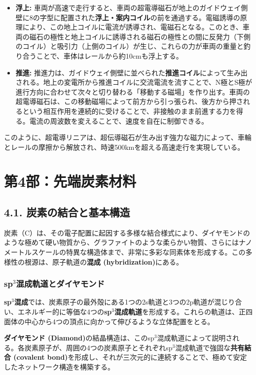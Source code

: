 \documentclass[11pt,a4paper]{ltjsarticle}
\begin{document}
\begin{itemize}
\item \textbf{浮上:} 車両が高速で走行すると、車両の超電導磁石が地上のガイドウェイ側壁に8の字型に配置された\textbf{浮上・案内コイル}の前を通過する。電磁誘導の原理により、この地上コイルに電流が誘導され、電磁石となる。このとき、車両の磁石の極性と地上コイルに誘導される磁石の極性との間に反発力（下側のコイル）と吸引力（上側のコイル）が生じ、これらの力が車両の重量と釣り合うことで、車体はレールから約10cmも浮上する。
\item \textbf{推進:} 推進力は、ガイドウェイ側壁に並べられた\textbf{推進コイル}によって生み出される。地上の変電所から推進コイルに交流電流を流すことで、N極とS極が進行方向に合わせて次々と切り替わる「移動する磁場」を作り出す。車両の超電導磁石は、この移動磁場によって前方から引っ張られ、後方から押されるという相互作用を連続的に受けることで、非接触のまま前進する力を得る。電流の周波数を変えることで、速度を自在に制御できる。
\end{itemize}

このように、超電導リニアは、超伝導磁石が生み出す強力な磁力によって、車輪とレールの摩擦から解放され、時速500kmを超える高速走行を実現している。

\section*{第4部：先端炭素材料}

\subsection*{4.1. 炭素の結合と基本構造}

炭素（C）は、その電子配置に起因する多様な結合様式により、ダイヤモンドのような極めて硬い物質から、グラファイトのような柔らかい物質、さらにはナノメートルスケールの特異な構造体まで、非常に多彩な同素体を形成する。この多様性の根源は、原子軌道の\textbf{混成 (hybridization)}にある。

\subsubsection*{sp$^3$混成軌道とダイヤモンド}

\textbf{sp$^3$混成}では、炭素原子の最外殻にある1つの2s軌道と3つの2p軌道が混じり合い、エネルギー的に等価な4つの\textbf{sp$^3$混成軌道}を形成する。これらの軌道は、正四面体の中心から4つの頂点に向かって伸びるような立体配置をとる。

\textbf{ダイヤモンド (Diamond)}の結晶構造は、このsp$^3$混成軌道によって説明される。各炭素原子が、周囲の4つの炭素原子とそれぞれsp$^3$混成軌道で強固な\textbf{共有結合 (covalent bond)}を形成し、それが三次元的に連続することで、極めて安定したネットワーク構造を構築する。
\end{document}
